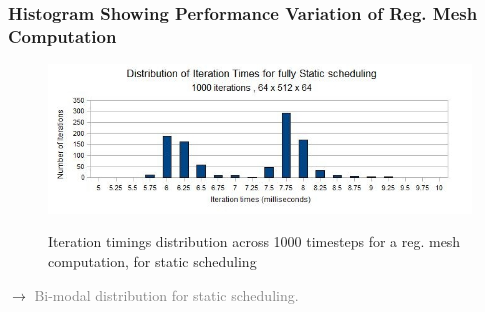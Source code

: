 \begin{frame}   
\frametitle{Histogram Showing Performance Variation of Reg. Mesh Computation}
\begin{figure}
\begin{center}                     
\includegraphics[scale=0.24]{plots/IterTimingsHisto-static}\\ 
\end{center}    
{\small Iteration timings distribution across 1000 timesteps for a reg. mesh computation, for static scheduling } 
\end{figure} 
\begin{center} 
{\small $\rightarrow$ \textcolor{gray}{Bi-modal distribution for static scheduling.}  } 
\end{center} 
\end{frame}                                     

